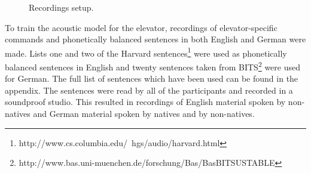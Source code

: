\documentclass[a4paper, 12pt]{article}
\begin{document}
\begin{figure}
\caption{Recordings setup.}
\label{fig:recordingsetup}
\end{figure}


To train the acoustic model for the elevator, recordings of elevator-specific commands and phonetically balanced sentences in both English and German were made. 
Lists one and two  of the Harvard sentences\footnote{http://www.cs.columbia.edu/~hgs/audio/harvard.html} were used as phonetically balanced sentences in English and twenty sentences taken from BITS\footnote{http://www.bas.uni-muenchen.de/forschung/Bas/BasBITSUSTABLE} were used for German. 
The full list of sentences which have been used can be found in the appendix. %
The sentences were read by all of the participants and recorded in a soundproof studio.
This resulted in recordings of English material spoken by non-natives and German material spoken by natives and by non-natives.
\end{document}
